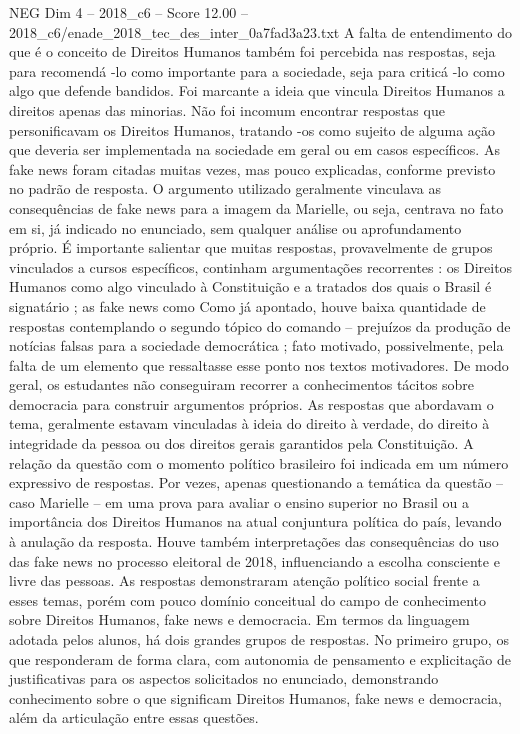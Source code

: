 \begin{textsample}{NEG Dim 4 – 2018\_c6 – Score 12.00 – 2018\_c6/enade\_2018\_tec\_des\_inter\_0a7fad3a23.txt}
A falta de entendimento do que é o conceito de Direitos Humanos também foi percebida nas respostas, seja para recomendá -lo como importante para a sociedade, seja para criticá -lo como algo que defende bandidos.
Foi marcante a ideia que vincula Direitos Humanos a direitos apenas das minorias.
Não foi incomum encontrar respostas que personificavam os Direitos Humanos, tratando -os como sujeito de alguma ação que deveria ser implementada na sociedade em geral ou em casos específicos.
As fake news foram citadas muitas vezes, mas pouco explicadas, conforme previsto no padrão de resposta.
O argumento utilizado geralmente vinculava as consequências de fake news para a imagem da Marielle, ou seja, centrava no fato em si, já indicado no enunciado, sem qualquer análise ou aprofundamento próprio.
É importante salientar que muitas respostas, provavelmente de grupos vinculados a cursos específicos, continham argumentações recorrentes : os Direitos Humanos como algo vinculado à Constituição e a tratados dos quais o Brasil é signatário ; as fake news como Como já apontado, houve baixa quantidade de respostas contemplando o segundo tópico do comando – prejuízos da produção de notícias falsas para a sociedade democrática ; fato motivado, possivelmente, pela falta de um elemento que ressaltasse esse ponto nos textos motivadores.
De modo geral, os estudantes não conseguiram recorrer a conhecimentos tácitos sobre democracia para construir argumentos próprios.
As respostas que abordavam o tema, geralmente estavam vinculadas à ideia do direito à verdade, do direito à integridade da pessoa ou dos direitos gerais garantidos pela Constituição.
A relação da questão com o momento político brasileiro foi indicada em um número expressivo de respostas.
Por vezes, apenas questionando a temática da questão – caso Marielle – em uma prova para avaliar o ensino superior no Brasil ou a importância dos Direitos Humanos na atual conjuntura política do país, levando à anulação da resposta.
Houve também interpretações das consequências do uso das fake news no processo eleitoral de 2018, influenciando a escolha consciente e livre das pessoas.
As respostas demonstraram atenção político social frente a esses temas, porém com pouco domínio conceitual do campo de conhecimento sobre Direitos Humanos, fake news e democracia.
Em termos da linguagem adotada pelos alunos, há dois grandes grupos de respostas.
No primeiro grupo, os que responderam de forma clara, com autonomia de pensamento e explicitação de justificativas para os aspectos solicitados no enunciado, demonstrando conhecimento sobre o que significam Direitos Humanos, fake news e democracia, além da articulação entre essas questões.

\end{textsample}
